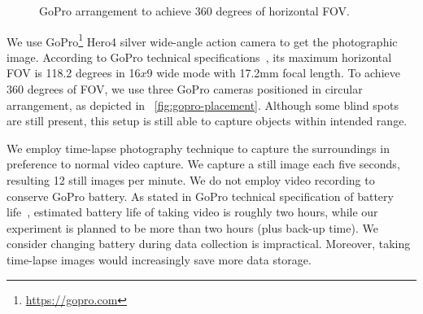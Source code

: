 	\begin{figure}[ht]
	\centering
	\hfill
	\caption[GoPro arrangement]{GoPro arrangement to achieve 360 degrees of horizontal \ac{FOV}.}
	\label{fig:gopro-placement}
	\end{figure}

	We use GoPro\footnote{\url{https://gopro.com}} Hero4 silver wide-angle action camera to get the photographic image. According to GoPro technical specifications~\cite{goprofieldofview}, its maximum horizontal \ac{FOV} is 118.2 degrees in 16$x$9 wide mode with 17.2mm focal length. To achieve 360 degrees of \ac{FOV}, we use three GoPro cameras positioned in circular arrangement, as depicted in ~\autoref{fig:gopro-placement}. Although some blind spots are still present, this setup is still able to capture objects within intended range.

	We employ time-lapse photography technique to capture the surroundings in preference to normal video capture. We capture a still image each five seconds, resulting 12 still images per minute. We do not employ video recording to conserve GoPro battery. As stated in GoPro technical specification of battery life~\cite{goprobattery}, estimated battery life of taking video is roughly two hours, while our experiment is planned to be more than two hours (plus back-up time). We consider changing battery during data collection is impractical. Moreover, taking time-lapse images would increasingly save more data storage.
	
